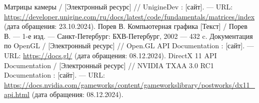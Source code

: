 \begin{thebibliography}{}
	  Матрицы камеры /  [Электронный ресурс] // UnigineDev : [сайт]. — URL: \url{https://developer.unigine.com/ru/docs/latest/code/fundamentals/matrices/index} (дата обращения: 23.10.2024).
	 Порев В. Компьютерная графика [Текст] / Порев В. — 1-е изд. — Санкт-Петербург: БХВ-Петербург, 2002 — 432 c.
	  Документация по OpenGL /  [Электронный ресурс] // Open.GL API Documentation : [сайт]. — URL: \url{https://docs.gl/} (дата обращения: 08.12.2024).
	  DirectX 11 API Documentation /  [Электронный ресурс] // NVIDIA TXAA 3.0 RC1 Documentation : [сайт]. — URL: \url{https://docs.nvidia.com/gameworks/content/gameworkslibrary/postworks/dx11_api.html} (дата обращения: 08.12.2024).
	
\end{thebibliography}
